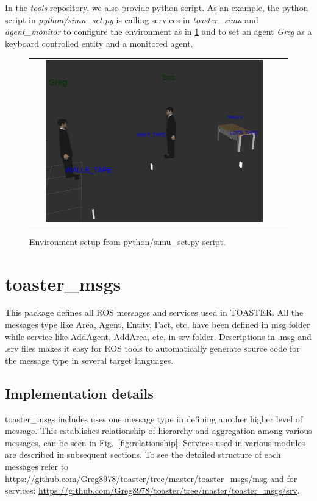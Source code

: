 \documentclass[a4paper]{article}
\begin{document}
In the \textit{tools} repository, we also provide python script.
As an example, the python script in \textit{python/simu\_set.py} is calling services in \textit{toaster\_simu} and \textit{agent\_monitor} to configure the environment as in \ref{fig:areaspencer} and to set an agent \textit{Greg} as a keyboard controlled entity and a monitored agent.

 \begin{figure}[ht!]
 \centering
 \begin{tabular}{cc}
  \includegraphics[width=0.9\textwidth]{img/pythonToast.jpg}
 \end{tabular}
 \caption{Environment setup from python/simu\_set.py script.}
 \label{fig:areaspencer}
 \end{figure}

\section{toaster\_msgs}
This package defines all ROS messages and services used in TOASTER. All the messages type like Area, Agent, Entity, Fact, etc, have been defined in msg folder while service like AddAgent, AddArea, etc, in srv folder. Descriptions in .msg and .srv files makes it easy for ROS tools to automatically generate source code for the message type in several target languages.


\subsection{Implementation details}

toaster\_msgs includes uses one message type in defining another higher level of message. This establishes relationship of hierarchy and aggregation among various messages, can be seen in Fig.~\ref{fig:relationship}. Services used in various modules are described in subsequent sections. To see the detailed structure of each messages refer to \url{https://github.com/Greg8978/toaster/tree/master/toaster_msgs/msg} and for services: \url{https://github.com/Greg8978/toaster/tree/master/toaster_msgs/srv}.
\end{document}
